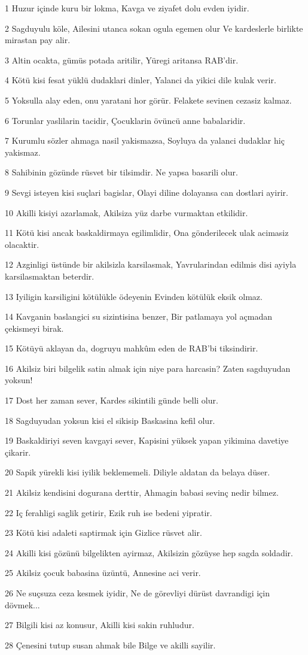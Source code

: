 \par 1 Huzur içinde kuru bir lokma, Kavga ve ziyafet dolu evden iyidir.
\par 2 Sagduyulu köle, Ailesini utanca sokan ogula egemen olur Ve kardeslerle birlikte mirastan pay alir.
\par 3 Altin ocakta, gümüs potada aritilir, Yüregi aritansa RAB'dir.
\par 4 Kötü kisi fesat yüklü dudaklari dinler, Yalanci da yikici dile kulak verir.
\par 5 Yoksulla alay eden, onu yaratani hor görür. Felakete sevinen cezasiz kalmaz.
\par 6 Torunlar yaslilarin tacidir, Çocuklarin övüncü anne babalaridir.
\par 7 Kurumlu sözler ahmaga nasil yakismazsa, Soyluya da yalanci dudaklar hiç yakismaz.
\par 8 Sahibinin gözünde rüsvet bir tilsimdir. Ne yapsa basarili olur.
\par 9 Sevgi isteyen kisi suçlari bagislar, Olayi diline dolayansa can dostlari ayirir.
\par 10 Akilli kisiyi azarlamak, Akilsiza yüz darbe vurmaktan etkilidir.
\par 11 Kötü kisi ancak baskaldirmaya egilimlidir, Ona gönderilecek ulak acimasiz olacaktir.
\par 12 Azginligi üstünde bir akilsizla karsilasmak, Yavrularindan edilmis disi ayiyla karsilasmaktan beterdir.
\par 13 Iyiligin karsiligini kötülükle ödeyenin Evinden kötülük eksik olmaz.
\par 14 Kavganin baslangici su sizintisina benzer, Bir patlamaya yol açmadan çekismeyi birak.
\par 15 Kötüyü aklayan da, dogruyu mahkûm eden de RAB'bi tiksindirir.
\par 16 Akilsiz biri bilgelik satin almak için niye para harcasin? Zaten sagduyudan yoksun!
\par 17 Dost her zaman sever, Kardes sikintili günde belli olur.
\par 18 Sagduyudan yoksun kisi el sikisip Baskasina kefil olur.
\par 19 Baskaldiriyi seven kavgayi sever, Kapisini yüksek yapan yikimina davetiye çikarir.
\par 20 Sapik yürekli kisi iyilik beklememeli. Diliyle aldatan da belaya düser.
\par 21 Akilsiz kendisini dogurana derttir, Ahmagin babasi sevinç nedir bilmez.
\par 22 Iç ferahligi saglik getirir, Ezik ruh ise bedeni yipratir.
\par 23 Kötü kisi adaleti saptirmak için Gizlice rüsvet alir.
\par 24 Akilli kisi gözünü bilgelikten ayirmaz, Akilsizin gözüyse hep sagda soldadir.
\par 25 Akilsiz çocuk babasina üzüntü, Annesine aci verir.
\par 26 Ne suçsuza ceza kesmek iyidir, Ne de görevliyi dürüst davrandigi için dövmek...
\par 27 Bilgili kisi az konusur, Akilli kisi sakin ruhludur.
\par 28 Çenesini tutup susan ahmak bile Bilge ve akilli sayilir.

